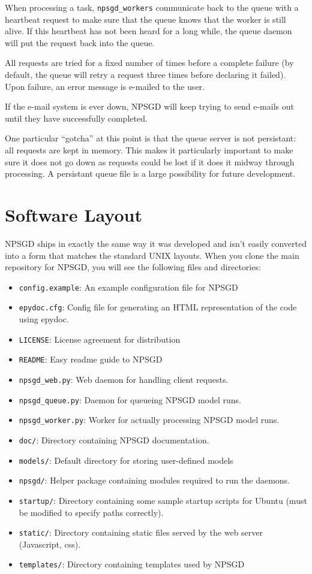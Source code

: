 \documentclass{article}
\newcommand{\mpath}[1]{\texttt{#1}}
\begin{document}
When processing a task, \texttt{npsgd\_workers} communicate back to the queue
with a heartbeat request to make sure that the queue knows that the worker is
still alive. If this heartbeat has not been heard for a long while, the queue
daemon will put the request back into the queue.

All requests are tried for a fixed number of times before a complete failure (by
default, the queue will retry a request three times before declaring it failed).
Upon failure, an error message is e-mailed to the user.

If the e-mail system is ever down, NPSGD will keep trying to send e-mails out
until they have successfully completed.

One particular ``gotcha'' at this point is that the queue server is not
persistant: all requests are kept in memory. This makes it particularly
important to make sure it does not go down as requests could be lost if it does
it midway through processing. A persistant queue file is a large possibility for
future development.

\section{Software Layout}
NPSGD ships in exactly the same way it was developed and isn't easily converted
into a form that matches the standard UNIX layouts. When you clone the main
repository for NPSGD, you will see the following files and directories:
\begin{itemize}
    \item \mpath{config.example}: An example configuration file for NPSGD
    \item \mpath{epydoc.cfg}: Config file for generating an HTML representation
          of the code using epydoc.
    \item \mpath{LICENSE}: License agreement for distribution
    \item \mpath{README}: Easy readme guide to NPSGD
    \item \mpath{npsgd\_web.py}: Web daemon for handling client requests.
    \item \mpath{npsgd\_queue.py}: Daemon for queueing NPSGD model runs.
    \item \mpath{npsgd\_worker.py}: Worker for actually processing NPSGD model
          runs.
    \item \mpath{doc/}: Directory containing NPSGD documentation.
    \item \mpath{models/}: Default directory for storing user-defined models
    \item \mpath{npsgd/}: Helper package containing modules required to run the
          daemons.
    \item \mpath{startup/}: Directory containing some sample startup scripts for
          Ubuntu (must be modified to specify paths correctly).
    \item \mpath{static/}: Directory containing static files served by the web
          server (Javascript, css).
    \item \mpath{templates/}: Directory containing templates used by NPSGD
\end{itemize}
\end{document}
